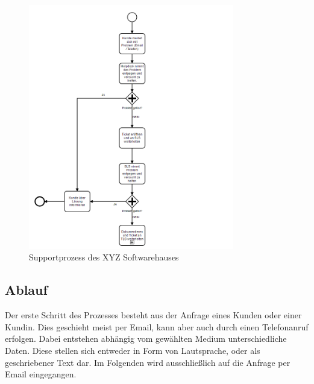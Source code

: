 \begin{figure}[ht]
	\centering
		\includegraphics[width=0.80\textwidth]{images/support_process.PNG}
	\caption{Supportprozess des XYZ Softwarehauses}
	\label{fig:support-process}
\end{figure}

\subsection{Ablauf}
Der erste Schritt des Prozesses besteht aus der Anfrage eines Kunden oder einer Kundin. Dies geschieht meist per Email, kann aber auch durch einen Telefonanruf erfolgen. Dabei entstehen abhängig vom gewählten Medium unterschiedliche Daten. Diese stellen sich entweder in Form von Lautsprache, oder als geschriebener Text dar. Im Folgenden wird ausschließlich auf die Anfrage per Email eingegangen.

